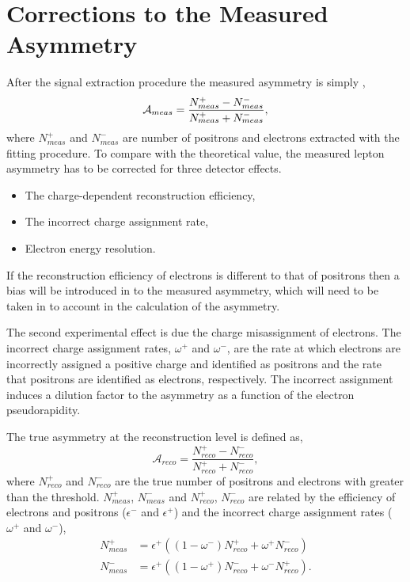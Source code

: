 \section{Corrections to the Measured Asymmetry}
After the signal extraction procedure the measured asymmetry is simply ,
\begin{equation}
\mathcal{A}_{meas} = \frac{
\label{eq:meas}
  N_{meas}^{+} -
  N_{meas}^{-}
}
{
  N_{meas}^{+} +
  N_{meas}^{-}
},
\end{equation}
where $N_{meas}^{+}$ and $N_{meas}^{-}$ are number of positrons and
electrons extracted with the fitting procedure.
To compare with the theoretical value, the measured lepton asymmetry has to be
corrected for three detector effects.
\begin{itemize}
\item The charge-dependent reconstruction efficiency,
\item The incorrect charge assignment rate,
\item Electron energy resolution.
\end{itemize}

If the reconstruction efficiency of electrons is different to that of positrons
then a bias will be introduced in to the measured asymmetry, which will need to
be taken in to account in the calculation of the asymmetry.  

The second experimental effect is due the charge misassignment of electrons.
The incorrect charge assignment rates, $\omega^+$ and $\omega^-$, are the rate
at which electrons are incorrectly assigned a positive charge and identified as
positrons and the rate that positrons are identified as electrons, respectively.  The
incorrect assignment induces a dilution factor to the asymmetry as a function of
the electron pseudorapidity. 

The true asymmetry at the reconstruction level is defined as,
\begin{equation}
\label{eq:reco}
\mathcal{A}_{reco} = \frac{
  N_{reco}^{+} -
  N_{reco}^{-}
}
{
  N_{reco}^{+} +
  N_{reco}^{-}
},
\end{equation}
where $N_{reco}^{+}$ and $N_{reco}^{-}$ are the true number of positrons and
electrons with \pT greater than the threshold.  $N_{meas}^{+}$, $N_{meas}^{-}$
and $N_{reco}^{+}$, $N_{reco}^{-}$ are related by the efficiency of electrons
and positrons ($\epsilon^{-}$ and $\epsilon^{+}$) and the incorrect charge
assignment rates ($\omega^{+}$ and $\omega^{-}$),
\begin{align}
  \label{eq:poscor}
  N_{meas}^{+} 
  &= \epsilon^+ \left( ( 1 - \omega^- ) N_{reco}^{+} + \omega^+ N_{reco}^{-} \right)\\
  \label{eq:negcor}
  N_{meas}^{-} 
  &= \epsilon^+ \left( ( 1 - \omega^+ ) N_{reco}^{-} + \omega^- N_{reco}^{+} \right).
\end{align}

